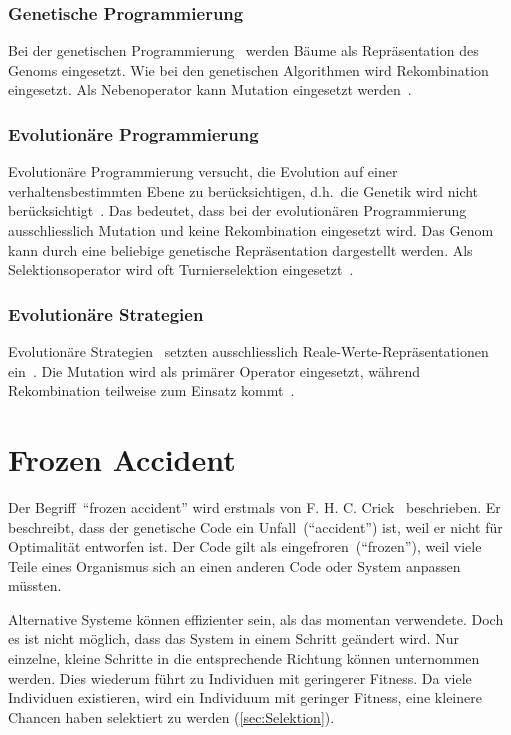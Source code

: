       \subsubsection{Genetische Programmierung\label{item:genProg}}

        Bei der genetischen Programmierung~\cite{book:genProg} werden Bäume als Repräsentation des Genoms eingesetzt.
        Wie bei den genetischen Algorithmen wird Rekombination eingesetzt.
        Als Nebenoperator kann Mutation eingesetzt werden~\cite[S.147]{book:evAlgo}.

      \subsubsection{Evolutionäre Programmierung\label{item:evProg}}

        Evolutionäre Programmierung versucht, die Evolution auf einer verhaltensbestimmten Ebene zu berücksichtigen,
        d.h.\ die Genetik wird nicht berücksichtigt~\cite[S.140]{book:evAlgo}.
        Das bedeutet, dass bei der evolutionären Programmierung~\cite{book:artIntSimEv}
        ausschliesslich Mutation und keine Rekombination eingesetzt wird.
        Das Genom kann durch eine beliebige genetische Repräsentation dargestellt werden.
        Als Selektionsoperator wird oft Turnierselektion eingesetzt~\cite[S.33]{book:bioInspired}.

      \subsubsection{Evolutionäre Strategien\label{item:evStrat}}

        Evolutionäre Strategien~\cite{book:evStrat} setzten ausschliesslich Reale-Werte-Repräsentationen ein~\cite[S.134]{book:evAlgo}.
        Die Mutation wird als primärer Operator eingesetzt, während Rekombination teilweise zum Einsatz kommt~\cite[S.134]{book:evAlgo}.


  \section{Frozen Accident}

    Der Begriff~``frozen accident'' wird erstmals von F. H. C. Crick~\cite{Crick1968} beschrieben.
    Er beschreibt, dass der genetische Code ein Unfall~(``accident'') ist,
    weil er nicht für Optimalität entworfen ist.
    Der Code gilt als eingefroren~(``frozen''),
    weil viele Teile eines Organismus sich an einen anderen Code oder System anpassen müssten.

    \medskip

    Alternative Systeme können effizienter sein, als das momentan verwendete.
    Doch es ist nicht möglich, dass das System in einem Schritt geändert wird.
    Nur einzelne, kleine Schritte in die entsprechende Richtung können unternommen werden.
    Dies wiederum führt zu Individuen mit geringerer Fitness.
    Da viele Individuen existieren, wird ein Individuum mit geringer Fitness,
    eine kleinere Chancen haben selektiert zu werden (\vref{sec:Selektion}).
